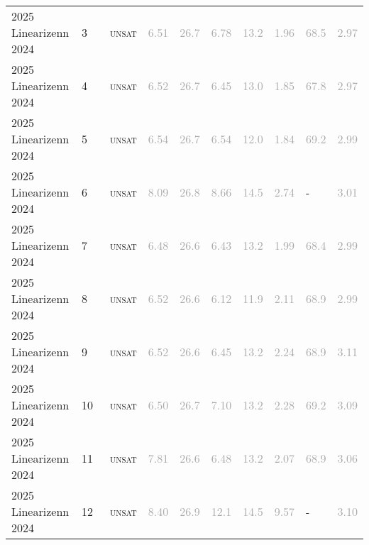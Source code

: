 \begin{center}
{\begin{longtable}{@{}llllllllll@{}}
2025 Linearizenn 2024 & 3 & ~\textsc{unsat} & \textcolor{darkgray}{6.51} & \textcolor{darkgray}{26.7} & \textcolor{darkgray}{6.78} & \textcolor{darkgray}{13.2} & \textcolor{darkgray}{1.96} & \textcolor{darkgray}{68.5} & \textcolor{darkgray}{2.97} \\
2025 Linearizenn 2024 & 4 & ~\textsc{unsat} & \textcolor{darkgray}{6.52} & \textcolor{darkgray}{26.7} & \textcolor{darkgray}{6.45} & \textcolor{darkgray}{13.0} & \textcolor{darkgray}{1.85} & \textcolor{darkgray}{67.8} & \textcolor{darkgray}{2.97} \\
2025 Linearizenn 2024 & 5 & ~\textsc{unsat} & \textcolor{darkgray}{6.54} & \textcolor{darkgray}{26.7} & \textcolor{darkgray}{6.54} & \textcolor{darkgray}{12.0} & \textcolor{darkgray}{1.84} & \textcolor{darkgray}{69.2} & \textcolor{darkgray}{2.99} \\
2025 Linearizenn 2024 & 6 & ~\textsc{unsat} & \textcolor{darkgray}{8.09} & \textcolor{darkgray}{26.8} & \textcolor{darkgray}{8.66} & \textcolor{darkgray}{14.5} & \textcolor{darkgray}{2.74} & - & \textcolor{darkgray}{3.01} \\
2025 Linearizenn 2024 & 7 & ~\textsc{unsat} & \textcolor{darkgray}{6.48} & \textcolor{darkgray}{26.6} & \textcolor{darkgray}{6.43} & \textcolor{darkgray}{13.2} & \textcolor{darkgray}{1.99} & \textcolor{darkgray}{68.4} & \textcolor{darkgray}{2.99} \\
2025 Linearizenn 2024 & 8 & ~\textsc{unsat} & \textcolor{darkgray}{6.52} & \textcolor{darkgray}{26.6} & \textcolor{darkgray}{6.12} & \textcolor{darkgray}{11.9} & \textcolor{darkgray}{2.11} & \textcolor{darkgray}{68.9} & \textcolor{darkgray}{2.99} \\
2025 Linearizenn 2024 & 9 & ~\textsc{unsat} & \textcolor{darkgray}{6.52} & \textcolor{darkgray}{26.6} & \textcolor{darkgray}{6.45} & \textcolor{darkgray}{13.2} & \textcolor{darkgray}{2.24} & \textcolor{darkgray}{68.9} & \textcolor{darkgray}{3.11} \\
2025 Linearizenn 2024 & 10 & ~\textsc{unsat} & \textcolor{darkgray}{6.50} & \textcolor{darkgray}{26.7} & \textcolor{darkgray}{7.10} & \textcolor{darkgray}{13.2} & \textcolor{darkgray}{2.28} & \textcolor{darkgray}{69.2} & \textcolor{darkgray}{3.09} \\
2025 Linearizenn 2024 & 11 & ~\textsc{unsat} & \textcolor{darkgray}{7.81} & \textcolor{darkgray}{26.6} & \textcolor{darkgray}{6.48} & \textcolor{darkgray}{13.2} & \textcolor{darkgray}{2.07} & \textcolor{darkgray}{68.9} & \textcolor{darkgray}{3.06} \\
2025 Linearizenn 2024 & 12 & ~\textsc{unsat} & \textcolor{darkgray}{8.40} & \textcolor{darkgray}{26.9} & \textcolor{darkgray}{12.1} & \textcolor{darkgray}{14.5} & \textcolor{darkgray}{9.57} & - & \textcolor{darkgray}{3.10} \\

\end{longtable}}
\end{center}
